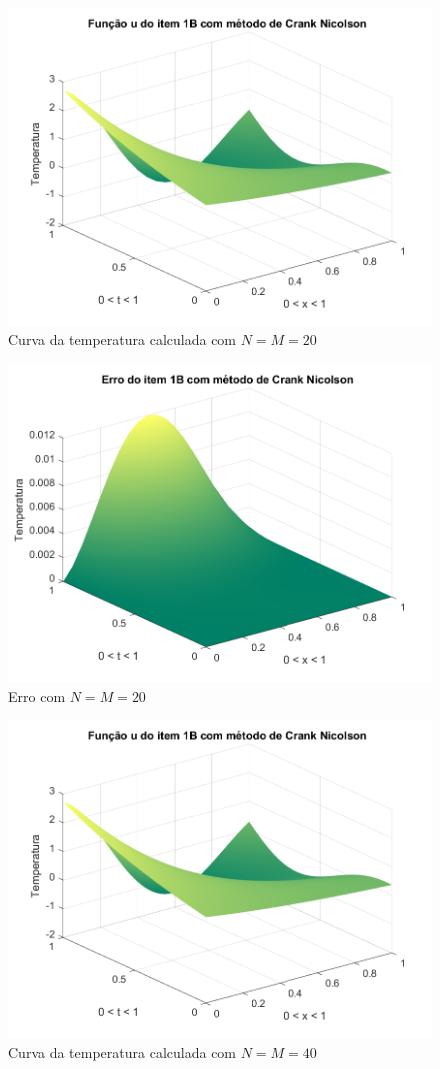 \documentclass[12pt]{article}
\begin{document}
\begin{spacing}{1.5}
\begin{figure}
    \centering
    \includegraphics[width=0.8\linewidth]{Segunda_Tarefa/ItemC/nm20_calculada_B.png}
    \caption{Curva da temperatura calculada com $N=M=20$}
    \label{fig:CB_nm20_calculada}
\end{figure}

\begin{figure}
    \centering
    \includegraphics[width=0.8\linewidth]{Segunda_Tarefa/ItemC/nm20_erro_B.png}
    \caption{Erro com $N=M=20$}
    \label{fig:CB_nm20_erro}
\end{figure}

\begin{figure}
    \centering
    \includegraphics[width=0.8\linewidth]{Segunda_Tarefa/ItemC/nm40_calculada_B.png}
    \caption{Curva da temperatura calculada com $N=M=40$}
    \label{fig:CB_nm40_calculada}
\end{figure}


\end{spacing}
\end{document}
